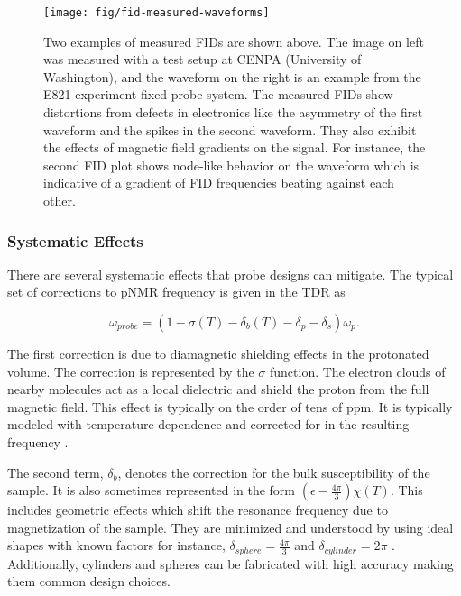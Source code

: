 \begin{figure}
\centering
\texttt{[image: fig/fid-measured-waveforms]}
\caption{
    Two examples of measured FIDs are shown above. The image on left was measured with a test setup at CENPA (University of Washington), and the waveform on the right is an example from the E821 experiment fixed probe system.  The measured FIDs show distortions from defects in electronics like the asymmetry of the first waveform and the spikes in the second waveform.  They also exhibit the effects of magnetic field gradients on the signal.  For instance, the second FID plot shows node-like behavior on the waveform which is indicative of a gradient of FID frequencies beating against each other.
    \label{fig:fid-measured-waveforms}
}
\end{figure}

\subsubsection{Systematic Effects}

There are several systematic effects that probe designs can mitigate. 
The typical set of corrections to pNMR frequency is given in the \mugmtwo TDR \cite{e989-tdr} as

\begin{equation}
\label{eqn:nmr-effects-model}
\omega_{probe} = (1 - \sigma(T) - \delta_b(T) - \delta_p - \delta_s) \omega_p.
\end{equation}

The first correction is due to diamagnetic shielding effects in the protonated volume.  The correction is represented by the $\sigma$ function.  The electron clouds of nearby molecules act as a local dielectric and shield the proton from the full magnetic field.  This effect is typically on the order of tens of ppm.  It is typically modeled with temperature dependence and corrected for in the resulting frequency \cite{schenk-med-nmr}.

The second term, $\delta_b$, denotes the correction for the bulk susceptibility of the sample.  It is also sometimes represented in the form $\left(\epsilon - \frac{4\pi}{3}\right) \chi(T)$.  This includes geometric effects which shift the resonance frequency due to magnetization of the sample.  They are minimized and understood by using ideal shapes with known factors for instance, $\delta_{sphere} = \frac{4\pi}{3}$ and $\delta_{cylinder} = 2\pi$ \cite{e989-tdr}.  Additionally, cylinders and spheres can be fabricated with high accuracy making them common design choices.


